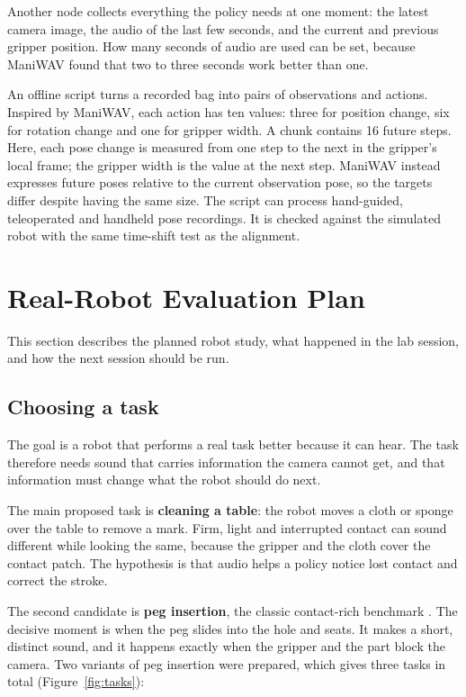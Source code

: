\documentclass[
  english,
  accentcolor=11b,
  type=intern,
  marginpar=false,
  logofile=figures/PEARLTUDA.png
]{tudapub}
\begin{document}
Another node collects everything the policy needs at one moment: the latest camera image, the audio of the last few seconds, and the current and previous gripper position. How many seconds of audio are used can be set, because ManiWAV found that two to three seconds work better than one.

An offline script turns a recorded bag into pairs of observations and actions. Inspired by ManiWAV, each action has ten values: three for position change, six for rotation change and one for gripper width. A chunk contains 16 future steps. Here, each pose change is measured from one step to the next in the gripper's local frame; the gripper width is the value at the next step. ManiWAV instead expresses future poses relative to the current observation pose, so the targets differ despite having the same size. The script can process hand-guided, teleoperated and handheld pose recordings. It is checked against the simulated robot with the same time-shift test as the alignment.

\section{Real-Robot Evaluation Plan}
\label{sec:plan}

This section describes the planned robot study, what happened in the lab session, and how the next session should be run.

\subsection{Choosing a task}
\label{sec:choosing-task}

The goal is a robot that performs a real task better because it can hear. The task therefore needs sound that carries information the camera cannot get, and that information must change what the robot should do next.

The main proposed task is \textbf{cleaning a table}: the robot moves a cloth or sponge over the table to remove a mark. Firm, light and interrupted contact can sound different while looking the same, because the gripper and the cloth cover the contact patch. The hypothesis is that audio helps a policy notice lost contact and correct the stroke.

The second candidate is \textbf{peg insertion}, the classic contact-rich benchmark \citep{lee2019visiontouch}. The decisive moment is when the peg slides into the hole and seats. It makes a short, distinct sound, and it happens exactly when the gripper and the part block the camera. Two variants of peg insertion were prepared, which gives three tasks in total (Figure~\ref{fig:tasks}):
\end{document}
